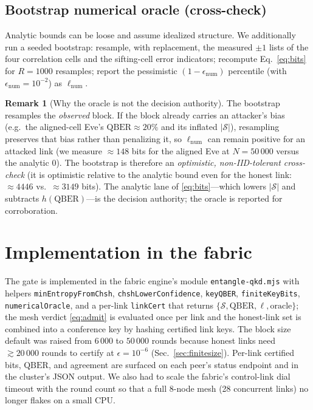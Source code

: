 \documentclass[11pt,a4paper]{article}
\newcommand{\CHSH}{\mathcal{S}}
\newcommand{\eps}{\epsilon}
\newcommand{\QBER}{\mathrm{QBER}}
\newcommand{\bits}{\ell}
\newcommand{\code}[1]{\texttt{#1}}
\theoremstyle{plain}
\theoremstyle{definition}
\newtheorem{remark}[theorem]{Remark}
\begin{document}
\subsection{Bootstrap numerical oracle (cross-check)}
Analytic bounds can be loose and assume idealized structure. We additionally run
a seeded bootstrap: resample, with replacement, the measured $\pm1$ lists of the
four correlation cells and the sifting-cell error indicators; recompute
Eq.~\eqref{eq:bits} for $R=1000$ resamples; report the pessimistic
$(1-\eps_{\mathrm{num}})$ percentile (with $\eps_{\mathrm{num}} = 10^{-2}$) as
$\bits_{\mathrm{num}}$.
\begin{remark}[Why the oracle is not the decision authority]
\label{rem:oracle}
The bootstrap resamples the \emph{observed} block. If the block already carries
an attacker's bias (e.g.\ the aligned-cell Eve's $\QBER \approx 20\%$ and its
inflated $|\CHSH|$), resampling preserves that bias rather than penalizing it,
so $\bits_{\mathrm{num}}$ can remain positive for an attacked link (we measure
$\approx 148$ bits for the aligned Eve at $N{=}50\,000$ versus the analytic
$0$). The bootstrap is therefore an \emph{optimistic, non-IID-tolerant
cross-check} (it is optimistic relative to the analytic bound even for the
honest link: $\approx 4446$ vs.\ $\approx 3149$ bits). The analytic lane of
\eqref{eq:bits}---which lowers $|\CHSH|$ and subtracts $h(\QBER)$---is the
decision authority; the oracle is reported for corroboration.
\end{remark}

\section{Implementation in the fabric}
The gate is implemented in the fabric engine's module \code{entangle-qkd.mjs}
with helpers \code{minEntropyFromChsh}, \code{chshLowerConfidence},
\code{keyQBER}, \code{finiteKeyBits}, \code{numericalOracle}, and a per-link
\code{linkCert} that returns $\{\CHSH, \QBER, \bits, \text{oracle}\}$; the mesh
verdict \eqref{eq:admit} is evaluated once per link and the honest-link set is
combined into a conference key by hashing certified link keys. The block size
default was raised from $6\,000$ to $50\,000$ rounds because honest links need
$\gtrsim 20\,000$ rounds to certify at $\eps=10^{-6}$ (Sec.~\ref{sec:finitesize}).
Per-link certified bits, $\QBER$, and agreement are surfaced on each peer's
status endpoint and in the cluster's JSON output. We also had to scale the
fabric's control-link dial timeout with the round count so that a full $8$-node
mesh (28 concurrent links) no longer flakes on a small CPU.
\end{document}
